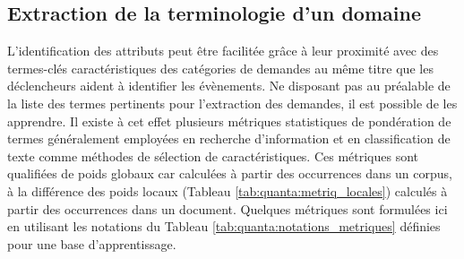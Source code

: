\subsection{Extraction de la terminologie d'un domaine}
\label{sec:quanta:extract-terminologie-domaine}
L'identification des attributs peut être facilitée grâce à leur proximité avec des termes-clés caractéristiques des catégories de demandes au même titre que les \og déclencheurs \fg{} aident à identifier les évènements.
Ne disposant pas au préalable de la liste des termes pertinents pour l'extraction des demandes, il est possible de les apprendre. Il existe à cet effet plusieurs métriques statistiques de pondération de termes généralement employées en recherche d'information et en classification de texte comme méthodes de sélection de caractéristiques. Ces métriques sont qualifiées de poids globaux car calculées à partir des occurrences dans un corpus, à la différence des poids locaux (Tableau \ref{tab:quanta:metriq_locales}) calculés à partir des occurrences dans un document. Quelques métriques sont formulées ici en utilisant les notations du Tableau \ref{tab:quanta:notations_metriques} définies pour une base d'apprentissage.


